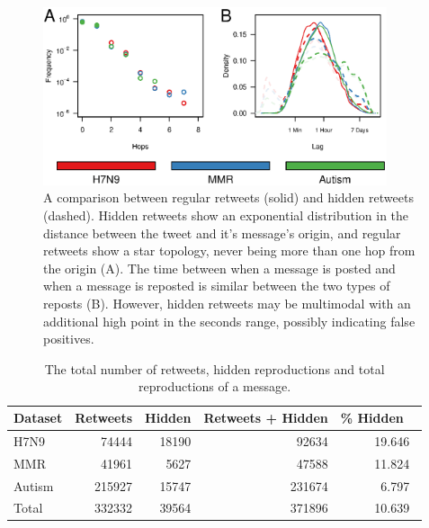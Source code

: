 \begin{figure}
\centering
\includegraphics[width=0.9\textwidth]{retweets/figures/compareTypes.eps}
\caption{A comparison between regular retweets (solid) and hidden retweets (dashed). Hidden retweets show an exponential distribution in the distance between the tweet and it's message's origin, and regular retweets show a star topology, never being more than one hop from the origin (A). The time between when a message is posted and when a message is reposted is similar between the two types of reposts (B). However, hidden retweets may be multimodal with an additional high point in the seconds range, possibly indicating false positives.}
\label{fig:tweet_lag}
\end{figure}


\begin{table}
\centering
\begin{tabular}{l|rrr|r} \hline
Dataset & Retweets & Hidden & Retweets + Hidden & \% Hidden \ \\ \hline 
H7N9 & 74444 & 18190 & 92634 & 19.646\ \\ 
MMR & 41961 & 5627 & 47588 & 11.824\ \\ 
Autism &  215927 & 15747 & 231674 & 6.797\ \\ \hline
Total & 332332 & 39564 & 371896 & 10.639\ \\ 
\end{tabular}
\caption{The total number of retweets, hidden reproductions and total reproductions of a message.}
\label{table:retweetType}
\end{table}

